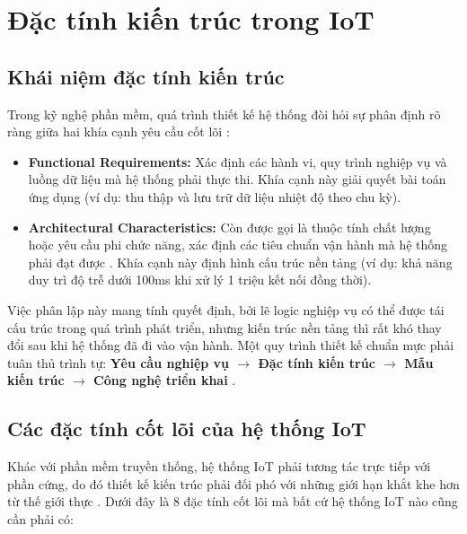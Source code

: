 \section{Đặc tính kiến trúc trong IoT}

\subsection{Khái niệm đặc tính kiến trúc}

Trong kỹ nghệ phần mềm, quá trình thiết kế hệ thống đòi hỏi sự phân định rõ ràng giữa hai khía cạnh yêu cầu cốt lõi \cite{richards2020}:

\begin{itemize}
    \item \textbf{Functional Requirements:} Xác định các hành vi, quy trình nghiệp vụ và luồng dữ liệu mà hệ thống phải thực thi. Khía cạnh này giải quyết bài toán ứng dụng (ví dụ: thu thập và lưu trữ dữ liệu nhiệt độ theo chu kỳ).
    \item \textbf{Architectural Characteristics:} Còn được gọi là thuộc tính chất lượng hoặc yêu cầu phi chức năng, xác định các tiêu chuẩn vận hành mà hệ thống phải đạt được \cite{richards2020}. Khía cạnh này định hình cấu trúc nền tảng (ví dụ: khả năng duy trì độ trễ dưới 100ms khi xử lý 1 triệu kết nối đồng thời).
\end{itemize}

Việc phân lập này mang tính quyết định, bởi lẽ logic nghiệp vụ có thể được tái cấu trúc trong quá trình phát triển, nhưng kiến trúc nền tảng thì rất khó thay đổi sau khi hệ thống đã đi vào vận hành. Một quy trình thiết kế chuẩn mực phải tuân thủ trình tự: \textbf{Yêu cầu nghiệp vụ $\rightarrow$ Đặc tính kiến trúc $\rightarrow$ Mẫu kiến trúc $\rightarrow$ Công nghệ triển khai} \cite{richards2020}.

\subsection{Các đặc tính cốt lõi của hệ thống IoT}

Khác với phần mềm truyền thống, hệ thống IoT phải tương tác trực tiếp với phần cứng, do đó thiết kế kiến trúc phải đối phó với những giới hạn khắt khe hơn từ thế giới thực \cite{lea2018}. Dưới đây là 8 đặc tính cốt lõi mà bất cứ hệ thống IoT nào cũng cần phải có:

